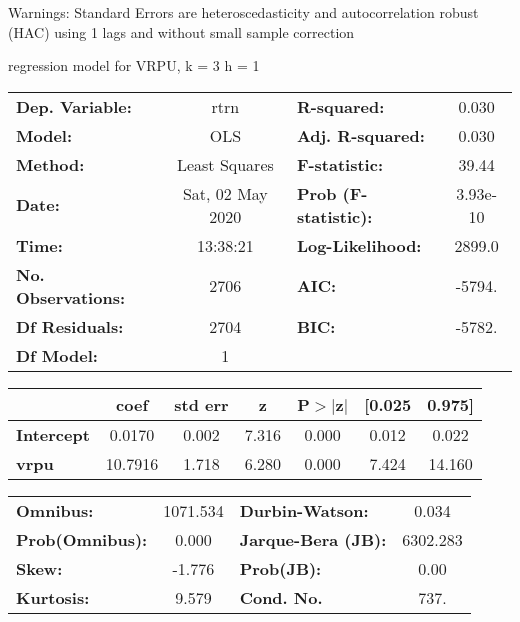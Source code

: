 Warnings: \newline
 [1] Standard Errors are heteroscedasticity and autocorrelation robust (HAC) using 1 lags and without small sample correction\ 

regression model for VRPU, k = 3 h = 1\begin{center}
\begin{tabular}{lclc}
\toprule
\textbf{Dep. Variable:}    &       rtrn       & \textbf{  R-squared:         } &     0.030   \\
\textbf{Model:}            &       OLS        & \textbf{  Adj. R-squared:    } &     0.030   \\
\textbf{Method:}           &  Least Squares   & \textbf{  F-statistic:       } &     39.44   \\
\textbf{Date:}             & Sat, 02 May 2020 & \textbf{  Prob (F-statistic):} &  3.93e-10   \\
\textbf{Time:}             &     13:38:21     & \textbf{  Log-Likelihood:    } &    2899.0   \\
\textbf{No. Observations:} &        2706      & \textbf{  AIC:               } &    -5794.   \\
\textbf{Df Residuals:}     &        2704      & \textbf{  BIC:               } &    -5782.   \\
\textbf{Df Model:}         &           1      & \textbf{                     } &             \\
\bottomrule
\end{tabular}
\begin{tabular}{lcccccc}
                   & \textbf{coef} & \textbf{std err} & \textbf{z} & \textbf{P$> |$z$|$} & \textbf{[0.025} & \textbf{0.975]}  \\
\midrule
\textbf{Intercept} &       0.0170  &        0.002     &     7.316  &         0.000        &        0.012    &        0.022     \\
\textbf{vrpu}      &      10.7916  &        1.718     &     6.280  &         0.000        &        7.424    &       14.160     \\
\bottomrule
\end{tabular}
\begin{tabular}{lclc}
\textbf{Omnibus:}       & 1071.534 & \textbf{  Durbin-Watson:     } &    0.034  \\
\textbf{Prob(Omnibus):} &   0.000  & \textbf{  Jarque-Bera (JB):  } & 6302.283  \\
\textbf{Skew:}          &  -1.776  & \textbf{  Prob(JB):          } &     0.00  \\
\textbf{Kurtosis:}      &   9.579  & \textbf{  Cond. No.          } &     737.  \\
\bottomrule
\end{tabular}
\end{center}

